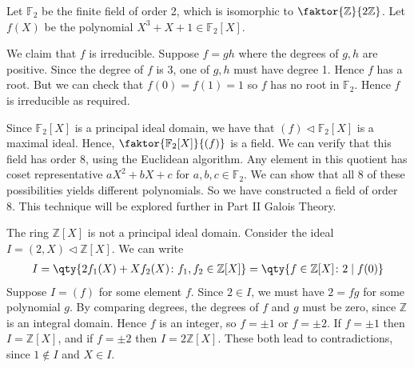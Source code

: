 \begin{example}
	Let $\mathbb F_2$ be the finite field of order 2, which is isomorphic to $\faktor{\mathbb Z}{2 \mathbb Z}$.
	Let $f(X)$ be the polynomial $X^3 + X + 1 \in \mathbb F_2[X]$.

	We claim that $f$ is irreducible.
	Suppose $f = gh$ where the degrees of $g, h$ are positive.
	Since the degree of $f$ is 3, one of $g, h$ must have degree 1.
	Hence $f$ has a root.
	But we can check that $f(0) = f(1) = 1$ so $f$ has no root in $\mathbb F_2$.
	Hence $f$ is irreducible as required.

	Since $\mathbb F_2[X]$ is a principal ideal domain, we have that $(f) \triangleleft \mathbb F_2[X]$ is a maximal ideal.
	Hence, $\faktor{\mathbb F_2[X]}{(f)}$ is a field.
	We can verify that this field has order 8, using the Euclidean algorithm.
	Any element in this quotient has coset representative $aX^2 + bX + c$ for $a,b,c \in \mathbb F_2$.
	We can show that all 8 of these possibilities yields different polynomials.
	So we have constructed a field of order 8.
	This technique will be explored further in Part II Galois Theory.
\end{example}
\begin{example}
	The ring $\mathbb Z[X]$ is not a principal ideal domain.
	Consider the ideal $I = (2, X) \triangleleft \mathbb Z[X]$.
	We can write
	\begin{align*}
		I = \qty{2f_1(X) + Xf_2(X) \colon f_1, f_2 \in \mathbb Z[X]} = \qty{f \in \mathbb Z[X] \colon 2\mid f(0)}
	\end{align*}
	Suppose $I = (f)$ for some element $f$.
	Since $2 \in I$, we must have $2 = fg$ for some polynomial $g$.
	By comparing degrees, the degrees of $f$ and $g$ must be zero, since $\mathbb Z$ is an integral domain.
	Hence $f$ is an integer, so $f = \pm 1$ or $f = \pm 2$.
	If $f = \pm 1$ then $I = \mathbb Z[X]$, and if $f = \pm 2$ then $I = 2\mathbb Z[X]$.
	These both lead to contradictions, since $1 \not\in I$ and $X \in I$.
\end{example}

